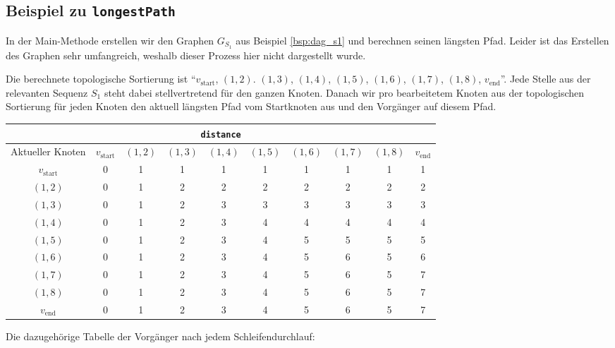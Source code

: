 \subsection{Beispiel zu \texttt{longestPath}}

In der Main-Methode erstellen wir den Graphen $G_{S_1}$ aus Beispiel \ref{bsp:dag_s1} und berechnen seinen längsten Pfad. Leider ist das Erstellen des Graphen sehr umfangreich, weshalb dieser Prozess hier nicht dargestellt wurde.

Die berechnete topologische Sortierung ist \enquote{$v_{\mathrm{start}}$, $(1,2)$. $(1,3)$, $(1,4)$, $(1,5)$, $(1,6)$, $(1,7)$, $(1,8)$, $v_{\mathrm{end}}$}. Jede Stelle aus der relevanten Sequenz $S_1$ steht dabei stellvertretend für den ganzen Knoten.  Danach wir pro bearbeitetem Knoten aus der topologischen Sortierung für jeden Knoten den aktuell längsten Pfad vom Startknoten aus und den Vorgänger auf diesem Pfad.

\begin{center}
\begin{tabular}{|c|ccccccccc|}
	\hline 
	 \multicolumn{10}{|c|}{\texttt{distance}} \\ \hline
	Aktueller Knoten & $v_{\mathrm{start}}$ & $(1,2)$ & $(1,3)$ & $(1,4)$ & $(1,5)$ & $(1,6)$ & $(1,7)$ & $(1,8)$ & $v_{\mathrm{end}}$ \\ \hline
	$v_{\mathrm{start}}$ & 0 & 1 & 1 & 1 & 1 & 1 & 1 & 1 & 1 \\
	$(1,2)$ & 0 & 1 & 2 & 2 & 2 & 2 & 2 & 2 & 2 \\
	$(1,3)$ & 0 & 1 & 2 & 3 & 3 & 3 & 3 & 3 & 3 \\
	$(1,4)$ & 0 & 1 & 2 & 3 & 4 & 4 & 4 & 4 & 4 \\
	$(1,5)$ & 0 & 1 & 2 & 3 & 4 & 5 & 5 & 5 & 5 \\
	$(1,6)$ & 0 & 1 & 2 & 3 & 4 & 5 & 6 & 5 & 6 \\
	$(1,7)$ & 0 & 1 & 2 & 3 & 4 & 5 & 6 & 5 & 7 \\
	$(1,8)$ & 0 & 1 & 2 & 3 & 4 & 5 & 6 & 5 & 7 \\
	$v_{\mathrm{end}}$ & 0 & 1 & 2 & 3 & 4 & 5 & 6 & 5 & 7 \\
	\hline
\end{tabular} 
\end{center}

\noindent Die dazugehörige Tabelle der Vorgänger nach jedem Schleifendurchlauf:

